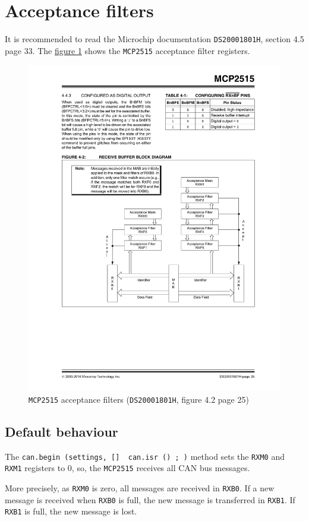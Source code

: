 \documentclass[9pt, a4paper, obeyspaces]{extarticle}
\newcommand \sectionLabel[2]{\section{#1}\label{sec:#2}}
\newcommand \subsectionLabel[2]{\subsection{#1}\label{subsec:#2}}
\newcommand\labelFigure[1]{\label{fig:#1}}
\newcommand\refFigure[2]{\hyperref[fig:#2]{figure \ref*{fig:#2}{\ifthenelse{\equal{#1}{}}{}{.#1}}}}
\begin{document}
\sectionLabel{Acceptance filters}{acceptanceFilters}

It is recommended to read the Microchip documentation \texttt{DS20001801H}, section 4.5 page 33. The \refFigure{}{figureFiltres2515} shows the \texttt{MCP2515} acceptance filter registers.



\begin{figure}[!ht]
  \small
  \centering
  \includegraphics[width=12cm]{mcp2515-filters.pdf}
  \caption{\texttt{MCP2515} acceptance filters (\texttt{DS20001801H}, figure 4.2 page 25)}
  \labelFigure{figureFiltres2515}
\end{figure}








\subsectionLabel{Default behaviour}{defautFilterBehaviour}

The \texttt{can.begin (settings, [] { can.isr () ; })} method sets the \texttt{RXM0} and \texttt{RXM1} registers to $0$, so, the \texttt{MCP2515} receives all CAN bus messages.

More precisely, as \texttt{RXM0} is zero, all messages are received in \texttt{RXB0}. If a new message is received when \texttt{RXB0} is full, the new message is transferred in \texttt{RXB1}. If \texttt{RXB1} is full, the new message is lost.
\end{document}
